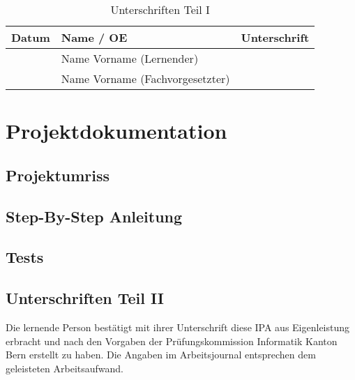 \documentclass[a4paper,11pt,oneside]{report}
\begin{document}
\begin{table}
\begin{tabularx}{\textwidth}{ |X|X|X| }
\hline
Datum & Name / OE & Unterschrift \\ \hline
 & Name Vorname (Lernender) & \\[5ex] \hline
 & Name Vorname (Fachvorgesetzter) & \\[5ex] \hline
\end{tabularx}
\caption{Unterschriften Teil I}
\end{table}

\part{Projektdokumentation}
\chapter{Projektumriss}


\chapter{Step-By-Step Anleitung}


\chapter{Tests}

%

%

%

%

\chapter{Unterschriften Teil II}
Die lernende Person bestätigt mit ihrer Unterschrift diese IPA aus Eigenleistung erbracht und nach den Vorgaben der Prüfungskommission Informatik Kanton Bern erstellt zu haben. Die Angaben im Arbeitsjournal entsprechen dem geleisteten Arbeitsaufwand.\\
\end{document}
